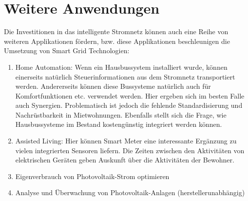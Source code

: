 \section{Weitere Anwendungen}\label{sec:weitere_anwendungen}
Die Investitionen in das intelligente Stromnetz können auch eine Reihe
von weiteren Applikationen fördern, bzw. diese Applikationen
beschleunigen die Umsetzung von Smart Grid Technologien:

\begin{enumerate}
  \item Home Automation: Wenn ein Hausbussystem installiert wurde,
	können einerseits natürlich Steuerinformationen aus dem Stromnetz
	transportiert werden. Andererseits können diese Bussysteme natürlich
	auch für Komfortfunktionen etc. verwendet werden. Hier ergeben sich
	im besten Falle auch Synergien. Problematisch ist jedoch die
	fehlende Standardisierung und Nachrüstbarkeit in Mietwohnungen.
	Ebenfalls stellt sich die Frage, wie Hausbussysteme im Bestand
	kostengünstig integriert werden können.
  \item Assisted Living: Hier können Smart Meter eine interessante
	Ergänzung zu vielen integrierten Sensoren liefern. Die Zeiten
	zwischen den Aktivitäten von elektrischen Geräten geben Auskunft
	über die Aktivitäten der Bewohner.
  \item Eigenverbrauch von Photovoltaik-Strom optimieren
  \item Analyse und Überwachung von Photovoltaik-Anlagen
	(herstellerunabhängig)
\end{enumerate}



